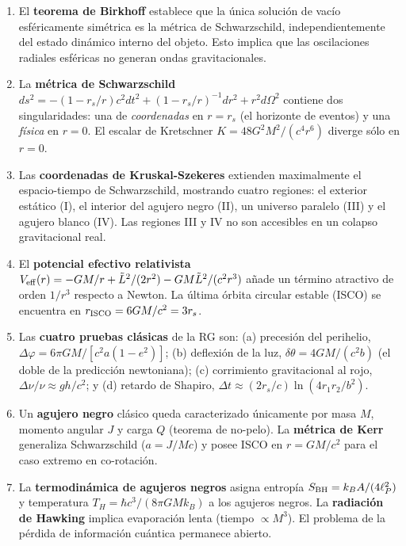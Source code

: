 \begin{enumerate}[leftmargin=2em, label=\textbf{\arabic*.}]

  \item El \textbf{teorema de Birkhoff} establece que la única solución de vacío esféricamente simétrica es la métrica de Schwarzschild, independientemente del estado dinámico interno del objeto. Esto implica que las oscilaciones radiales esféricas no generan ondas gravitacionales.

  \item La \textbf{métrica de Schwarzschild}
  \(ds^2 = -(1-r_s/r)c^2dt^2 + (1-r_s/r)^{-1}dr^2 + r^2 d\Omega^2\)
  contiene dos singularidades: una de \emph{coordenadas} en $r = r_s$ (el horizonte de eventos) y una \emph{física} en $r = 0$. El escalar de Kretschner $K = 48G^2M^2/(c^4 r^6)$ diverge sólo en $r = 0$.

  \item Las \textbf{coordenadas de Kruskal-Szekeres} extienden maximalmente el espacio-tiempo de Schwarzschild, mostrando cuatro regiones: el exterior estático (I), el interior del agujero negro (II), un universo paralelo (III) y el agujero blanco (IV). Las regiones III y IV no son accesibles en un colapso gravitacional real.

  \item El \textbf{potencial efectivo relativista} $V_{\rm eff}(r) = -GM/r + \tilde{L}^2/(2r^2) - GM\tilde{L}^2/(c^2 r^3)$ añade un término atractivo de orden $1/r^3$ respecto a Newton. La última órbita circular estable (ISCO) se encuentra en $r_{\rm ISCO} = 6GM/c^2 = 3r_s$.

  \item Las \textbf{cuatro pruebas clásicas} de la RG son: (a) precesión del perihelio, $\Delta\varphi = 6\pi GM/[c^2 a(1-e^2)]$; (b) deflexión de la luz, $\delta\theta = 4GM/(c^2 b)$ (el doble de la predicción newtoniana); (c) corrimiento gravitacional al rojo, $\Delta\nu/\nu \approx gh/c^2$; y (d) retardo de Shapiro, $\Delta t \approx (2r_s/c)\ln(4r_1r_2/b^2)$.

  \item Un \textbf{agujero negro} clásico queda caracterizado únicamente por masa $M$, momento angular $J$ y carga $Q$ (teorema de no-pelo). La \textbf{métrica de Kerr} generaliza Schwarzschild ($a = J/Mc$) y posee ISCO en $r = GM/c^2$ para el caso extremo en co-rotación.

  \item La \textbf{termodinámica de agujeros negros} asigna entropía $S_{\rm BH} = k_B A/(4\ell_P^2)$ y temperatura $T_H = \hbar c^3/(8\pi GMk_B)$ a los agujeros negros. La \textbf{radiación de Hawking} implica evaporación lenta (tiempo $\propto M^3$). El problema de la pérdida de información cuántica permanece abierto.

\end{enumerate}

